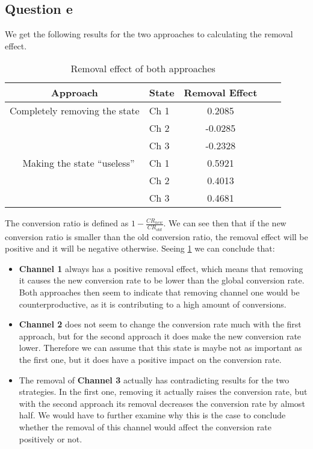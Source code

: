 \documentclass[11pt, a4paper]{article}
\begin{document}
\subsection{Question e}
We get the following results for the two approaches to calculating the removal effect.
\begin{table}[H]
	\centering  
	\begin{tabular}{clccc}
		\toprule
		          Approach            & State & Removal Effect &  &  \\ \midrule
		Completely removing the state & Ch 1  &     0.2085     &  &  \\
		                              & Ch 2  &    -0.0285     &  &  \\
		                              & Ch 3  &    -0.2328     &  &  \\ 
		Making the state ``useless''  & Ch 1  &     0.5921     &  &  \\
		                              & Ch 2  &     0.4013     &  &  \\
		                              & Ch 3  &     0.4681     &  &  \\ \bottomrule
	\end{tabular}
	\caption{Removal effect of both approaches}
	\label{tab:removal-effect}
\end{table}
The conversion ratio is defined as $1 - \frac{CR_{new}}{CR_{old}}$. We can see then that if the new conversion ratio is smaller than the old conversion ratio, the removal effect will be positive and it will be negative otherwise.
Seeing \cref{tab:removal-effect} we can conclude that:
\begin{itemize}
	\item \textbf{Channel 1} always has a positive removal effect, which means that removing it causes the new conversion rate to be lower than the global conversion rate. Both approaches then seem to indicate that removing channel one would be counterproductive, as it is contributing to a high amount of conversions.
	\item \textbf{Channel 2} does not seem to change the conversion rate much with the first approach, but for the second approach it does make the new conversion rate lower. Therefore we can assume that this state is maybe not as important as the first one, but it does have a positive impact on the conversion rate.
	\item The removal of \textbf{Channel 3} actually has contradicting results for the two strategies. In the first one, removing it actually raises the conversion rate, but with the second approach its removal decreases the conversion rate by almost half. We would have to further examine why this is the case to conclude whether the removal of this channel would affect the conversion rate positively or not.
\end{itemize}
\end{document}

